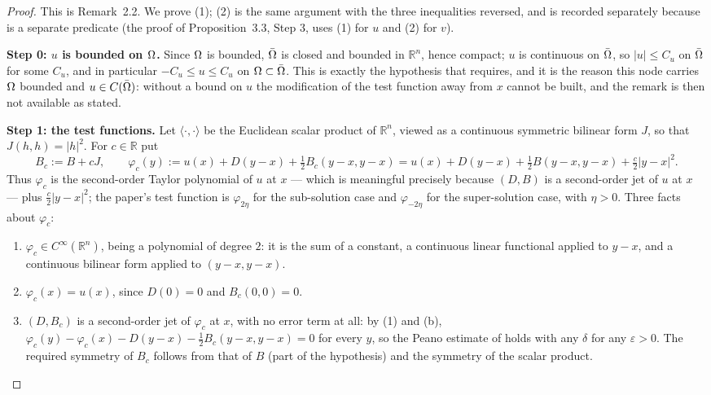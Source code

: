 \begin{proof}
This is Remark~2.2. We prove (1); (2) is the same argument with the three inequalities
reversed, and is recorded separately because  is a separate
predicate (the proof of Proposition~3.3, Step 3, uses (1) for $u$ and (2) for $v$).

\medskip\noindent\textbf{Step 0: $u$ is bounded on $\Omega$.} Since $\Omega$ is bounded,
$\bar{\Omega}$ is closed and bounded in $\mathbb R^{n}$, hence compact; $u$ is continuous on
$\bar{\Omega}$, so $|u|\le C_u$ on $\bar{\Omega}$ for some $C_u$, and in particular
$-C_u\le u\le C_u$ on $\Omega\subset\bar{\Omega}$. This is exactly the hypothesis that
 requires, and it is the reason this node carries $\Omega$
bounded and $u\in C(\bar{\Omega})$: without a bound on $u$ the modification of the test
function away from $x$ cannot be built, and the remark is then not available as stated.

\medskip\noindent\textbf{Step 1: the test functions.} Let $\langle\cdot,\cdot\rangle$ be
the Euclidean scalar product of $\mathbb R^{n}$, viewed as a continuous symmetric bilinear
form $J$, so that $J(h,h)=|h|^{2}$. For $c\in\mathbb R$ put
\[
 B_c:=B+cJ,\qquad
 \varphi_c(y):=u(x)+D(y-x)+\tfrac12B_c(y-x,y-x)
 =u(x)+D(y-x)+\tfrac12B(y-x,y-x)+\tfrac c2|y-x|^{2}. \tag{1}
\]
Thus $\varphi_c$ is the second-order Taylor polynomial of $u$ at $x$ --- which is
meaningful precisely because $(D,B)$ is a second-order jet of $u$ at $x$ --- plus
$\frac c2|y-x|^{2}$; the paper's test function is $\varphi_{2\eta}$ for the sub-solution
case and $\varphi_{-2\eta}$ for the super-solution case, with $\eta>0$. Three facts about
$\varphi_c$:
\begin{enumerate}
\item[(a)] $\varphi_c\in C^{\infty}(\mathbb R^{n})$, being a polynomial of degree $2$: it
  is the sum of a constant, a continuous linear functional applied to $y-x$, and a
  continuous bilinear form applied to $(y-x,y-x)$.
\item[(b)] $\varphi_c(x)=u(x)$, since $D(0)=0$ and $B_c(0,0)=0$.
\item[(c)] $(D,B_c)$ is a second-order jet of $\varphi_c$ at $x$, with no error term at
  all: by (1) and (b), $\varphi_c(y)-\varphi_c(x)-D(y-x)-\frac12B_c(y-x,y-x)=0$ for every
  $y$, so the Peano estimate of  holds with any $\delta$ for any
  $\varepsilon>0$. The required symmetry of $B_c$ follows from that of $B$ (part of the
  hypothesis) and the symmetry of the scalar product.
\end{enumerate}


\end{proof}
